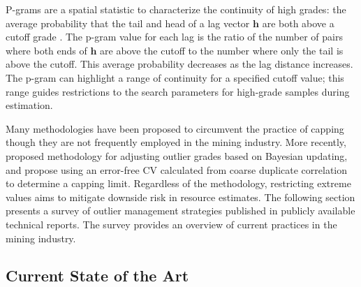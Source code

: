 P-grams are a spatial statistic to characterize the continuity of high grades: the average probability that the tail and head of a lag vector $\mathbf{h}$ are both above a cutoff grade \citep{leuangthong2015dealing, nowak2019optimal}. The p-gram value for each lag is the ratio of the number of pairs where both ends of $\mathbf{h}$ are above the cutoff to the number where only the tail is above the cutoff. This average probability decreases as the lag distance increases. The p-gram can highlight a range of continuity for a specified cutoff value; this range guides restrictions to the search parameters for high-grade samples during estimation.

Many methodologies have been proposed to circumvent the practice of capping \citep{rivoirard2013topcut, fourie2019limiting,maleki2014capping,costa2003reducing,hawkins1984robust,machado2012field,journel1983nonparametric,parker1991statistical} though they are not frequently employed in the mining industry. More recently, \cite{silva2021classification} proposed methodology for adjusting outlier grades based on Bayesian updating, and \cite{dutaut2021new} propose using an error-free \gls{CV} calculated from coarse duplicate correlation to determine a capping limit. Regardless of the methodology, restricting extreme values aims to mitigate downside risk in resource estimates. The following section presents a survey of outlier management strategies published in publicly available technical reports. The survey provides an overview of current practices in the mining industry.



\FloatBarrier
\subsection{Current State of the Art}
\label{subsec:02state}

